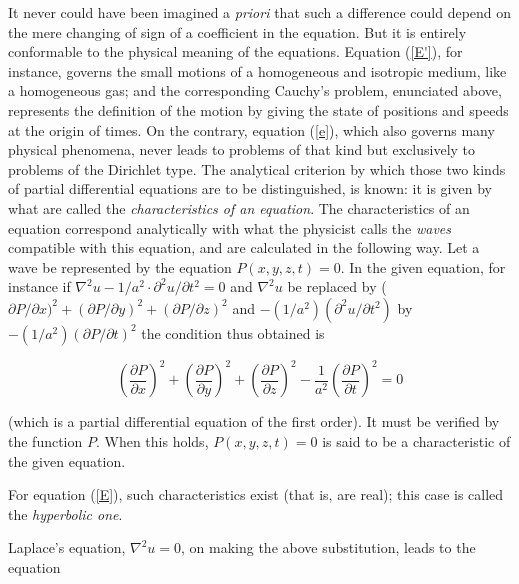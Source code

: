 \documentclass[12pt,oneside]{book}
\newcommand{\iit}[1]{\textit{#1}}
\begin{document}
It never could have been imagined a \iit{priori} that such a difference could
depend on the mere changing of sign of a coefficient in the equation. But it is
entirely conformable to the physical meaning of the equations. Equation
(\ref{E'}), for instance, governs the small motions of a homogeneous and
isotropic medium, like a homogeneous gas; and the corresponding Cauchy's
problem, enunciated above, represents the definition of the motion by giving the
state of positions and speeds at the origin of times. On the contrary, equation
(\ref{e}), which also governs many physical phenomena, never leads to problems
of that kind but exclusively to problems of the Dirichlet type. The analytical
criterion by which those two kinds of partial differential equations are to be
distinguished, is known: it is given by what are called the \iit{characteristics
of an equation}. The characteristics of an equation correspond analytically with
what the physicist calls the \iit{waves} compatible with this equation, and are
calculated in the following way. Let a wave be represented by the equation
$P(x,y,z,t)=0$. In the given equation, for instance if
$\nabla^2u-1/a^2\cdot\partial^2u/\partial t^2=0$ and $\nabla^2u$ be replaced by
($\partial P/\partial x)^2+(\partial P/\partial y)^2+(\partial P/\partial z)^2$
and $-(1/a^2)(\partial^2u/\partial t^2)$ by $-(1/a^2)(\partial P/\partial t)^2$
the condition thus obtained is

\begin{equation*}
    \left(\frac{\partial P}{\partial x}\right)^2+\left(\frac{\partial P}{\partial y}\right)^2+\left(\frac{\partial P}{\partial z}\right)^2-\frac{1}{a^2}\left(\frac{\partial P}{\partial t}\right)^2=0
\end{equation*}

(which is a partial differential equation of the first order). It must be
verified by the function $P$. When this holds, $P(x,y,z,t)=0$ is said to be a
characteristic of the given equation. \par

For equation (\ref{E}), such characteristics exist (that is, are real); this
case is called the \iit{hyperbolic one}. \par

Laplace's equation, $\nabla^2u=0$, on making the above substitution, leads to
the equation
\end{document}

